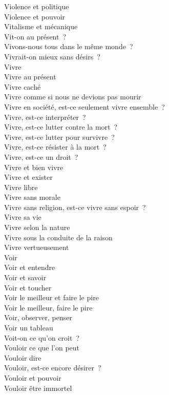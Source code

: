 \documentclass[a4paper,12pt]{article}
\begin{document}
Violence et politique \\
Violence et pouvoir \\
Vitalisme et mécanique \\
Vit-on au présent ? \\
Vivons-nous tous dans le même monde ? \\
Vivrait-on mieux sans désirs ? \\
Vivre \\
Vivre au présent \\
Vivre caché \\
Vivre comme si nous ne devions pas mourir \\
Vivre en société, est-ce seulement vivre ensemble ? \\
Vivre, est-ce interpréter ? \\
Vivre, est-ce lutter contre la mort ? \\
Vivre, est-ce lutter pour survivre ? \\
Vivre, est-ce résister à la mort ? \\
Vivre, est-ce un droit ? \\
Vivre et bien vivre \\
Vivre et exister \\
Vivre libre \\
Vivre sans morale \\
Vivre sans religion, est-ce vivre sans espoir ? \\
Vivre sa vie \\
Vivre selon la nature \\
Vivre sous la conduite de la raison \\
Vivre vertueusement \\
Voir \\
Voir et entendre \\
Voir et savoir \\
Voir et toucher \\
Voir le meilleur et faire le pire \\
Voir le meilleur, faire le pire \\
Voir, observer, penser \\
Voir un tableau \\
Voit-on ce qu'on croit ? \\
Vouloir ce que l'on peut \\
Vouloir dire \\
Vouloir, est-ce encore désirer ? \\
Vouloir et pouvoir \\
Vouloir être immortel \\
\end{document}
